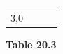 {\begin{center}
\begin{xtabular*}{\mytablewidth}[t]{|p{10\mystarwidth}|p{10\mystarwidth}|p{10\mystarwidth}|p{10\mystarwidth}|}
         &
    
    
         &
    
    
     \tabularnewline{}
    
    
        3,0 &
    
    
         &
    
    
         &
    
    
     \tabularnewline{}
    \end{xtabular*}
      \end{center}
    \begin{center}{\small\bfseries Table 20.3}\end{center}
    
    \addtocounter{footnote}{-0}
    
        }%
      
